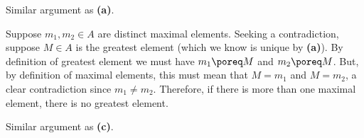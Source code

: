 \begin{questions}
\begin{partquestions}{\alph*}
        \item Similar argument as \textbf{(a)}.
        
        \item Suppose $m_1, m_2 \in A$ are distinct maximal elements. Seeking a contradiction, suppose $M \in A$ is the greatest element (which we know is unique by \textbf{(a)}). By definition of greatest element we must have $m_1 \poreq M$ and $m_2 \poreq M$. But, by definition of maximal elements, this must mean that $M = m_1$ and $M = m_2$, a clear contradiction since $m_1 \neq m_2$. Therefore, if there is more than one maximal element, there is no greatest element.
        
        \item Similar argument as \textbf{(c)}.
    \end{partquestions}
\end{questions}
